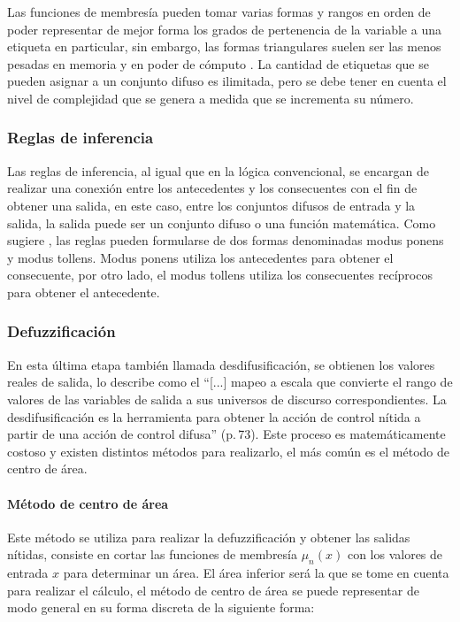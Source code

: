 			Las funciones de membresía pueden tomar varias formas y rangos en orden de poder representar de mejor forma los grados de pertenencia de la variable a una etiqueta en particular, sin embargo, las formas triangulares suelen ser las menos pesadas en memoria y en poder de cómputo \Parencite{riid2003transparent}. La cantidad de etiquetas que se pueden asignar a un conjunto difuso es ilimitada, pero se debe tener en cuenta el nivel de complejidad que se genera a medida que se incrementa su número.
			
		\subsubsection{Reglas de inferencia}
			
			Las reglas de inferencia, al igual que en la lógica convencional, se encargan de realizar una conexión entre los antecedentes y los consecuentes con el fin de obtener una salida, en este caso, entre los conjuntos difusos de entrada y la salida, la salida puede ser un conjunto difuso o una función matemática. Como sugiere \textcite{cruz2010inteligencia}, las reglas pueden formularse de dos formas denominadas modus ponens y modus tollens. Modus ponens utiliza los antecedentes para obtener el consecuente, por otro lado, el modus tollens utiliza los consecuentes recíprocos para obtener el antecedente.

		\subsubsection{Defuzzificación}

			En esta última etapa también llamada desdifusificación, se obtienen los valores reales de salida, \textcite{cruz2010inteligencia} lo describe como el \enquote{[...] mapeo a escala que convierte el rango de valores de las variables de salida a sus universos de discurso correspondientes. La desdifusificación es la herramienta para obtener la acción de control nítida a partir de una acción de control difusa} (p.$\,$73). Este proceso es matemáticamente costoso y existen distintos métodos para realizarlo, el más común es el método de centro de área.
			
			\paragraph{Método de centro de área}

				Este método se utiliza para realizar la defuzzificación y obtener las salidas nítidas, consiste en cortar las funciones de membresía $\mu_{n}(x)$ con los valores de entrada $x$ para determinar un área. El área inferior será la que se tome en cuenta para realizar el cálculo, el método de centro de área se puede representar de modo general en su forma discreta de la siguiente forma:
				
